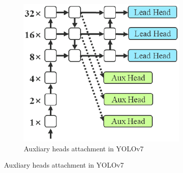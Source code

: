   \begin{figure}[H]
      \centering

      \begin{subfigure}[][][t]{0.5\textwidth}
        \includegraphics[width=1\linewidth]{figures/auxilary-head.png}
        \caption{Auxliary heads attachment in YOLOv7}
        \label{fig:aux-head}
      \end{subfigure}


\end{figure}
